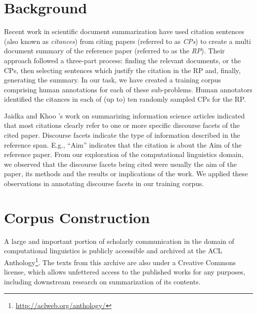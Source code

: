\documentclass[11pt]{article}
\begin{document}
\section{Background}
Recent work \cite{mohammad2009,abu2011} in scientific document
summarization have used citation sentences (also known as {\it citances}) from citing papers (referred to as {\it CPs}) to create a multi document summary of the reference paper (referred to as the {\it RP}). Their approach followed a three-part process: finding the relevant documents, or the CPs, then selecting sentences which justify the citation in the RP and, finally, generating the summary. In our task, we have created a training corpus comprising human annotations for each of these sub-problems. Human annotators identified the citances in each of (up to) ten randomly sampled CPs for the RP.

Jaidka and Khoo 's work on summarizing information science articles indicated that most citations clearly
refer to one or more specific discourse facets of the cited paper. Discourse facets indicate the type of information described in the reference span. E.g., ``Aim'' indicates that the citation is about the Aim of the reference paper. From our exploration of the computational linguistics domain, we observed that the discourse facets being cited were usually the aim of the paper, its methods and the results or implications of the work. We applied these observations in annotating discourse facets in our training corpus. 

\section{Corpus Construction}
\label{corpus}
A large and important portion of scholarly communication in the domain of computational linguistics is publicly accessible and archived at the ACL Anthology\footnote{\url{http://aclweb.org/anthology/}}. The texts from this archive are also under a Creative Commons license, which allows unfettered access to the published works for any purposes, including downstream research on summarization of its contents.  
\end{document}
